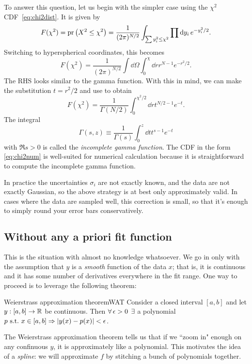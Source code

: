 To answer this question, let us begin with the simpler case using
the $\chi^2$ CDF~\eqref{eq:chi2dist}. It is given by
\begin{equation}
  F(\chi^2)=\operatorname{pr}\left(X^2\le\chi^2\right)
           =\frac{1}{(2\pi)^{N/2}}\int_{\sum y_i^2\le\chi^2}
            \prod\dd{y_i}e^{-y_i^2/2}.
\end{equation}
Switching to hyperspherical coordinates, this becomes
\begin{equation}
  F(\chi^2)=\frac{1}{(2\pi)^{N/2}}
              \int\dd{\Omega}\int_0^\chi\dd{r}r^{N-1}e^{-r^2/2}.
\end{equation}
The RHS looks similar to the gamma function. With this in mind,
we can make the substitution $t=r^2/2$ and use 
to obtain
\begin{equation}\label{eq:chi2num}
  F(\chi^2)=\frac{1}{\Gamma(N/2)}\int_0^{\chi^2/2}\dd{r}t^{N/2-1}e^{-t}.
\end{equation}
  The integral
  \begin{equation}
    \Gamma(s,z)\equiv\frac{1}{\Gamma(s)}\int_0^z\dd{t}t^{s-1}e^{-t}
  \end{equation}
  with $\Re s>0$ is called the {\it incomplete gamma function}.
The CDF in the form \eqref{eq:chi2num} is well-suited for numerical
calculation because it is straightforward to compute the incomplete
gamma function.

In practice the uncertainties $\sigma_i$ are not exactly known, and the
data are not exactly Gaussian, so the above strategy is at best only
approximately valid. In cases where the data are sampled well, this
correction is small, so that it's enough to simply round your
error bars conservatively.


\subsection{Without any a priori fit function}


This is the situation with almost no knowledge whatsoever. We go in only with
the assumption that $y$ is a {\it smooth} 
function of the data $x$; that is, it is continuous and
it has some number of derivatives everywhere in the fit range.
One way to proceed is to leverage the following theorem:
\begin{theorem}{Weierstrass approximation theorem}{WAT}
Consider a closed interval $[a,b]$ and let $y:[a,b]\to\mathbb{R}$
be continuous. Then $\operatorname{\forall}\epsilon>0$ $\operatorname{\exists}$ a polynomial 
$p~\text{s.t.}~ x\in[a,b]\Rightarrow |y(x)-p(x)|<\epsilon$.
\end{theorem}
The Weierstrass approximation theorem
tells us that if we ``zoom in" enough on any confinuous $y$, it is approximately
like a polynomial. This motivates the idea of a {\it spline}: we
will approximate $f$ by stitching a bunch of polynomials together.

